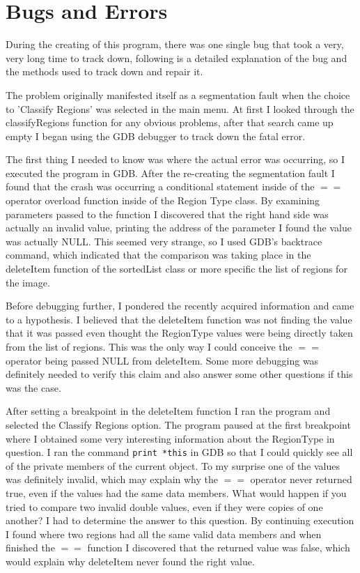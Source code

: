 \documentclass[pdftex, 11pt]{article}
\begin{document}
\section{Bugs and Errors}

During the creating of this program, there was one single bug that took a very, very long time to track down, following
is a detailed explanation of the bug and the methods used to track down and repair it.

The problem originally manifested itself as a segmentation fault when the choice to 'Classify Regions' was selected in
the main menu.  At first I looked through the classifyRegions function for any obvious problems, after that search came
up empty I began using the GDB debugger to track down the fatal error.

The first thing I needed to know was where the actual error was occurring, so I executed the program in GDB.  After the
re-creating the segmentation fault I found that the crash was occurring a conditional statement inside of the $==$
operator overload function inside of the Region Type class.  By examining parameters passed to the function I discovered
that the right hand side was actually an invalid value, printing the address of the parameter I found the value was
actually NULL.  This seemed very strange, so I used GDB's backtrace command, which indicated that the comparison was
taking place in the deleteItem function of the sortedList class or more specific the list of regions for the image.

Before debugging further, I pondered the recently acquired information and came to a hypothesis.  I believed that the
deleteItem function was not finding the value that it was passed even thought the RegionType values were being directly
taken from the list of regions.  This was the only way I could conceive the $==$ operator being passed NULL from
deleteItem.  Some more debugging was definitely needed to verify this claim and also answer some other questions if this
was the case.

After setting a breakpoint in the deleteItem function I ran the program and selected the Classify Regions option.  The
program paused at the first breakpoint where I obtained some very interesting information about the RegionType in
question.  I ran the command \texttt{print *this} in GDB so that I could quickly see all of the private members of the
current object.  To my surprise one of the values was definitely invalid, which may explain why the $==$ operator never
returned true, even if the values had the same data members.  What would happen if you tried to compare two invalid double
values, even if they were copies of one another?  I had to determine the answer to this question.  By continuing execution
I found where two regions had all the same valid data members and when finished the $==$ function I discovered that the
returned value was false, which would explain why deleteItem never found the right value.
\end{document}
